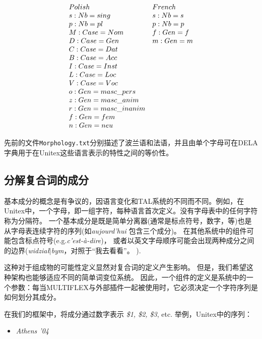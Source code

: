 \[
\begin{array}[c]{ll}
Polish                        &French\\
s: Nb=sing                    &s: Nb=s  \\
p: Nb=pl                      &p: Nb=p \\
M: Case=Nom                   &f: Gen=f  \\
D: Case=Gen                   &m: Gen=m    \\
C: Case=Dat  &\\
B: Case=Acc  &\\
I: Case=Inst  &\\
L: Case=Loc  &\\
V: Case=Voc  &\\
o: Gen=masc\_pers  &\\
z: Gen=masc\_anim  &\\
r: Gen=masc\_inanim  &\\
f: Gen=fem  &\\
n: Gen=neu &
\end{array}
\]

\bigskip
\noindent 先前的文件\verb+Morphology.txt+分别描述了波兰语和法语，并且由单个字母可在DELA字典用于在Unitex这些语言表示的特性之间的等价性。

\subsection{分解复合词的成分}
\label{subsec:decomp}
基本成分的概念是有争议的，因语言变化和TAL系统的不同而不同。例如，在Unitex中，一个字母，即一组字符，每种语言首次定义。没有字母表中的任何字符称为分隔符。
一个基本成分是既是简单分离器(通常是标点符号，数字，等)也是从字母表连续字符的序列(如\emph{aujourd'hui} 包含三个成分)。
在其他系统中的组件可能包含标点符号(e.g.\emph{c'est-\`a-dire})，
或者以英文字母顺序可能会出现两种成分之间的边界(\emph{widzia\l$\mid$bym}，对照于“我去看看”。
\cite{PrzepWol03}). 

\bigskip
\noindent 这种对于组成物的可能性定义显然对复合词的定义产生影响。
但是，我们希望这种架构也能够适应不同的简单词变位系统。
因此，一个组件的定义是系统中的一个参数：每当MULTIFLEX与外部插件一起被使用时，它必须决定一个字符序列是如何划分其成分。

\bigskip
\noindent 在我们的框架中，将成分通过数字表示
\emph{\$1, \$2, \$3}, etc. 
举例，Unitex中的序列：

\begin{itemize}
\item \emph{Athens '04}
\end{itemize} 

